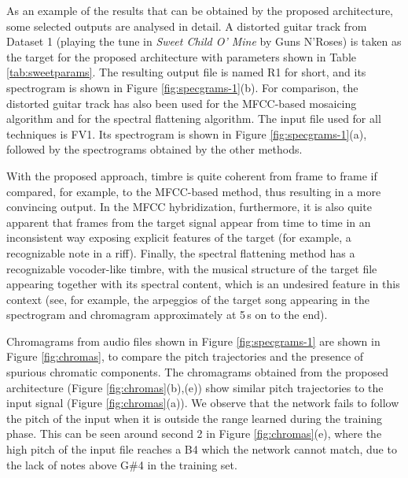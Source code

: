 As an example of the results that can be obtained by the proposed architecture, some selected outputs are analysed in detail. A distorted guitar track from Dataset 1 (playing the tune in \textit{Sweet Child O' Mine} by Guns N'Roses) is taken as the target for the proposed architecture with parameters shown in Table \ref{tab:sweetparams}. The resulting output file is named R1 for short, and its spectrogram is shown in Figure \ref{fig:specgrams-1}(b). For comparison, the distorted guitar track has also been used for the MFCC-based mosaicing algorithm and for the spectral flattening algorithm. The input file used for all techniques is FV1. Its spectrogram is shown in Figure \ref{fig:specgrams-1}(a), followed by the spectrograms obtained by the other methods.

With the proposed approach, timbre is quite coherent from frame to frame if compared, for example, to the MFCC-based method, thus resulting in a more convincing output. In the MFCC hybridization, furthermore, it is also quite apparent that frames from the target signal appear from time to time in an inconsistent way exposing explicit features of the target (for example, a recognizable note in a riff). Finally, the spectral flattening method has a recognizable vocoder-like timbre, with the musical structure of the target file appearing together with its spectral content, which is an undesired feature in this context (see, for example, the arpeggios of the target song appearing in the spectrogram and chromagram approximately at 5\,s on to the end).

Chromagrams from audio files shown in Figure \ref{fig:specgrams-1} are shown in Figure \ref{fig:chromas}, to compare the pitch trajectories and the presence of spurious chromatic components. The chromagrams obtained from the proposed architecture (Figure \ref{fig:chromas}(b),(e)) show similar pitch trajectories to the input signal (Figure \ref{fig:chromas}(a)). We observe that the network fails to follow the pitch of the input when it is outside the range learned during the training phase. This can be seen around second 2 in Figure \ref{fig:chromas}(e), where the high pitch of the input file reaches a B4 which the network cannot match, due to the lack of notes above G\#4 in the training set.


